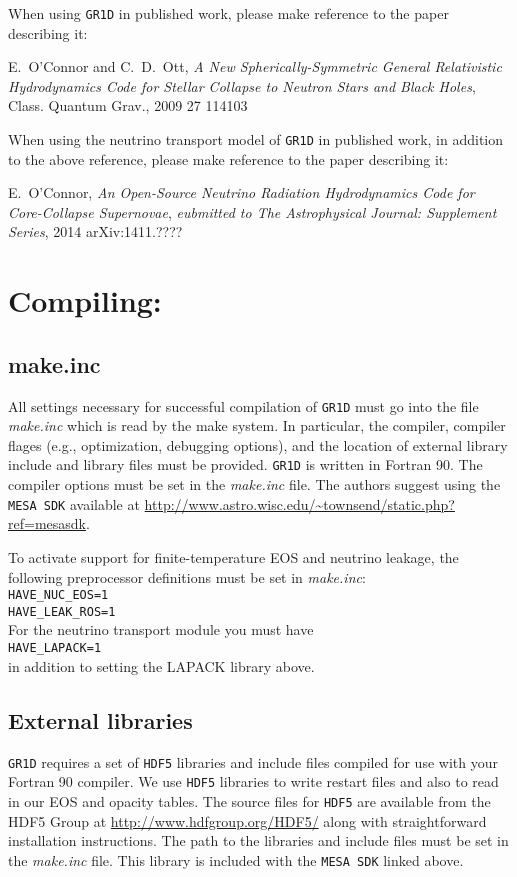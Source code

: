 \documentclass[10pt,nofootinbib]{article}
\newcommand{\code}[1]{\texttt{#1}}
\begin{document}
When using \code{GR1D} in published work, please make reference
to the paper describing it:

\hspace{2cm}\parbox{12cm}{E.\ O'Connor and C.\ D.\ Ott, \emph{A New Spherically-Symmetric
General Relativistic Hydrodynamics Code for Stellar Collapse to Neutron
Stars and Black Holes}, Class. Quantum Grav., 2009 27 114103}

When using the neutrino transport model of \code{GR1D} in published
work, in addition to the above reference, please make reference to
the paper describing it:

\hspace{2cm}\parbox{12cm}{E.\ O'Connor, \emph{An Open-Source Neutrino
    Radiation Hydrodynamics Code for Core-Collapse Supernovae},
  \emph{eubmitted to The Astrophysical Journal: Supplement Series},
  2014 arXiv:1411.????}

\section{Compiling:}
\subsection{make.inc}
All settings necessary for successful compilation of \code{GR1D} must
go into the file {\emph{make.inc}} which is read by the make
system. In particular, the compiler, compiler flages (e.g.,
optimization, debugging options), and the location of external library
include and library files must be provided. \code{GR1D} is written in
Fortran 90.  The compiler options must be set in the {\it make.inc}
file. The authors suggest using the \code{MESA SDK} available at
\url{http://www.astro.wisc.edu/~townsend/static.php?ref=mesasdk}.

To activate support for finite-temperature EOS and neutrino leakage,
the following preprocessor definitions must be set in \emph{make.inc}:\\
{\tt HAVE\_NUC\_EOS=1}\\
{\tt HAVE\_LEAK\_ROS=1}\\
For the neutrino transport module you must have\\
{\tt HAVE\_LAPACK=1}\\
in addition to setting the LAPACK library above.

\subsection{External libraries}
\code{GR1D} requires a set of \code{HDF5} libraries and include files
compiled for use with your Fortran 90 compiler.  We use \code{HDF5}
libraries to write restart files and also to read in our EOS and
opacity tables.  The source files for \code{HDF5} are available from
the HDF5 Group at \url{http://www.hdfgroup.org/HDF5/} along with
straightforward installation instructions.  The path to the libraries
and include files must be set in the {\it make.inc} file.  This
library is included with the \code{MESA SDK} linked above.
\end{document}
